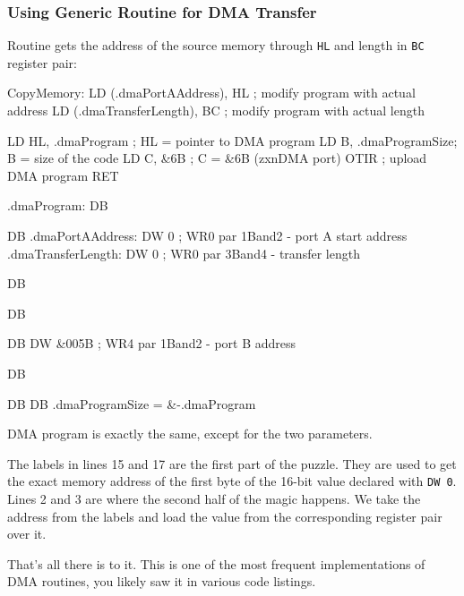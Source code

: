 {\subsubsection{Using Generic Routine for DMA Transfer}

Routine gets the address of the source memory through {\tt HL} and length in {\tt BC} register pair:

\begin{tcblisting}{}
CopyMemory:
	LD (.dmaPortAAddress), HL      ; modify program with actual address
	LD (.dmaTransferLength), BC  ; modify program with actual length

	LD HL, .dmaProgram     ; HL = pointer to DMA program
	LD B, .dmaProgramSize; B = size of the code
	LD C, &6B              ; C = &6B (zxnDMA port)
	OTIR                   ; upload DMA program
	RET

.dmaProgram:
	DB %

	DB %
.dmaPortAAddress:
	DW 0                   ; WR0 par 1Band2 - port A start address
.dmaTransferLength:
	DW 0                   ; WR0 par 3Band4 - transfer length

	DB %

	DB %

	DB %
	DW &005B               ; WR4 par 1Band2 - port B address

	DB %

	DB %
	DB %
.dmaProgramSize = &-.dmaProgram
\end{tcblisting}

DMA program is exactly the same, except for the two  parameters.

The labels in lines 15 and 17 are the first part of the puzzle. They are used to get the exact memory address of the first byte of the 16-bit value declared with {\tt DW 0}. Lines 2 and 3 are where the second half of the magic happens. We take the address from the labels and load the value from the corresponding register pair over it.

That's all there is to it. This is one of the most frequent implementations of DMA routines, you likely saw it in various code listings.

}
